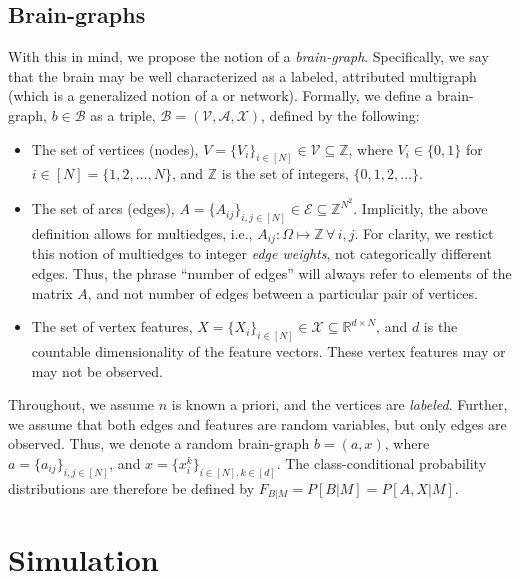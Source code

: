\documentclass{article}
\newcommand{\mA}{\mathcal{A}}
\newcommand{\mB}{\mathcal{B}}
\newcommand{\mE}{\mathcal{E}}
\newcommand{\mV}{\mathcal{V}}
\newcommand{\mX}{\mathcal{X}}
\newcommand{\Real}{\mathbb{R}}
\begin{document}

\subsection{Brain-graphs} %
\label{sub:brain_graphs}


With this in mind, we propose the notion of a \emph{brain-graph}. Specifically, we say that the brain may be well characterized as a labeled, attributed multigraph (which is a generalized notion of a or network). Formally, we define a brain-graph, $b\in \mB$ as a triple, $\mB=(\mV,\mA,\mX)$, defined by the following:
\begin{itemize}
	\item The set of vertices (nodes), $V=\{V_i\}_{i\in[N]} \in \mV \subseteq \mathbb{Z}$, where $V_i \in \{0,1\}$ for $i \in [N]=\{1,2,\ldots,N\}$, and  $\mathbb{Z}$ is the set of integers, $\{0,1,2,\ldots\}$.  
	\item The set of arcs (edges), $A=\{A_{ij}\}_{i,j \in [N]} \in \mE \subseteq \mathbb{Z}^{N^2}$. Implicitly, the above definition allows for multiedges, i.e.,  $A_{ij}: \Omega \mapsto \mathbb{Z}\, \forall \, i,j$.  For clarity, we restict this notion of multiedges to integer \emph{edge weights}, not categorically different edges.  Thus, the phrase  ``number of edges'' will always refer to elements of the matrix $A$, and not number of edges between a particular pair of vertices.  
	\item The set of vertex features, $X=\{X_i\}_{i\in[N]} \in \mX \subseteq \Real^{d \times N}$, and $d$ is the countable dimensionality of the feature vectors. These vertex features may or may not be observed.
\end{itemize}

Throughout, we assume $n$ is known a priori, and the vertices are \emph{labeled}.  Further, we assume that both edges and features are random variables, but only edges are observed.  Thus, we denote a random brain-graph $b=(a,x)$, where $a=\{a_{ij}\}_{i,j \in [N]}$, and $x=\{x_i^k\}_{i\in[N], k \in [d]}$.  The class-conditional probability distributions are therefore be defined by $F_{B|M}=P[B | M]=P[A,X|M]$.  



\section{Simulation} %
\label{sec:simulation}
\end{document}
